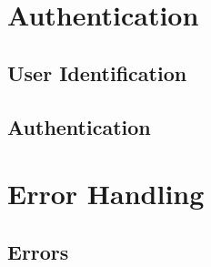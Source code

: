 \section{Authentication}
\label{sec:Datenmodell:Auth}

\subsection*{User Identification}



\subsection*{Authentication}



\section{Error Handling}
\subsection*{Errors}


